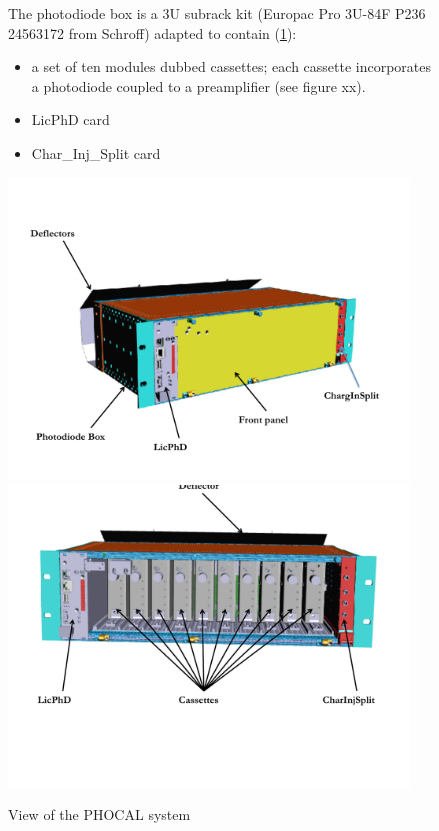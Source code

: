 \begin{figure}[htbp]

The photodiode box is a 3U subrack kit (Europac Pro 3U-84F P236 24563172 from Schroff) adapted to contain (\ref{fig:lasphotodiodebox}):
\begin{itemize}
\item a set of ten modules dubbed cassettes; each cassette incorporates a photodiode coupled to a preamplifier (see figure xx).  
\item LicPhD card
\item Char_Inj_Split card
\end{itemize}



\centering
\includegraphics[height=8cm]{figures/Photodiodebox.pdf}
\includegraphics[height=8cm]{figures/Photodiodebox2.pdf}
\caption{View of the PHOCAL system}\label{fig:lasphotodiodebox}
\end{figure}